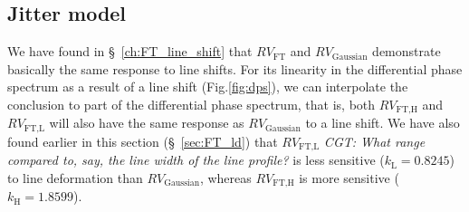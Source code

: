 %
%
%
%



\subsection{Jitter model}

We have found in \S~\ref{ch:FT_line_shift} that $RV_\text{FT}$ and $RV_\text{Gaussian}$ demonstrate basically the same response to line shifts. For its linearity in the differential phase spectrum as a result of a line shift (Fig.\ref{fig:dps}), we can interpolate the conclusion to part of the differential phase spectrum, that is, both $RV_\text{FT,H}$ and $RV_\text{FT,L}$ will also have the same response as $RV_\text{Gaussian}$ to a line shift. 
We have also found earlier in this section (\S~\ref{sec:FT_ld}) that $RV_\text{FT,L}$ 
{\em CGT: What range compared to, say, the line width of the line profile?} 
is less sensitive ($k_\text{L} = 0.8245$) to line deformation than $RV_\text{Gaussian}$, whereas $RV_\text{FT,H}$ is more sensitive ($k_\text{H} = 1.8599$).

